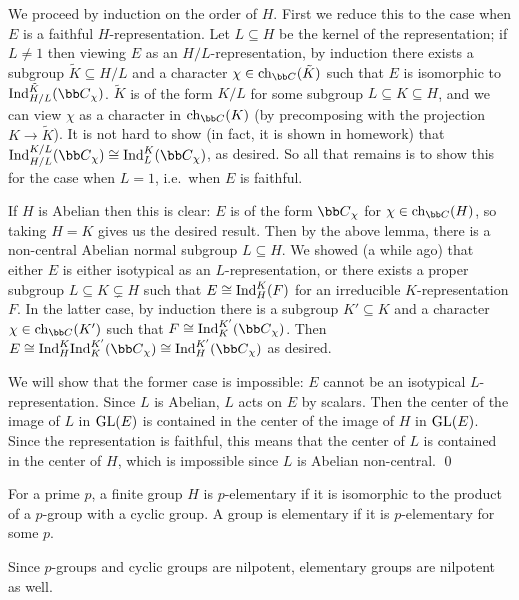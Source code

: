 \bproof

    We proceed by induction on the order of $H$.
    First we reduce this to the case when $E$ is a faithful $H$-representation.
    Let $L\subseteq H$ be the kernel of the representation; if $L\neq1$ then viewing $E$ as an $H/L$-representation, by induction there exists a subgroup $\tilde K\subseteq H/L$ and a
    character $\chi\in\ch_\bC(\tilde K)$ such that $E$ is isomorphic to $\Ind^{\tilde K}_{H/L}(\bC_\chi)$.
    $\tilde K$ is of the form $K/L$ for some subgroup $L\subseteq K\subseteq H$, and we can view $\chi$ as a character in $\ch_\bC(K)$ (by precomposing with the projection $K\to\tilde K$).
    It is not hard to show (in fact, it is shown in homework) that $\Ind^{K/L}_{H/L}(\bC_\chi)\cong\Ind^K_L(\bC_\chi)$, as desired.
    So all that remains is to show this for the case when $L=1$, i.e.\ when $E$ is faithful.

    If $H$ is Abelian then this is clear: $E$ is of the form $\bC_\chi$ for $\chi\in\ch_\bC(H)$, so taking $H=K$ gives us the desired result.
    Then by the above lemma, there is a non-central Abelian normal subgroup $L\subseteq H$.
    We showed (a while ago) that either $E$ is either isotypical as an $L$-representation, or there exists a proper subgroup $L\subseteq K\subsetneq H$ such that $E\cong{\rm Ind}^K_H(F)$ for an
    irreducible $K$-representation $F$.
    In the latter case, by induction there is a subgroup $K'\subseteq K$ and a character $\chi\in\ch_\bC(K')$ such that $F\cong\Ind^{K'}_K(\bC_\chi)$.
    Then $E\cong\Ind^K_H\Ind^{K'}_K(\bC_\chi)\cong\Ind^{K'}_H(\bC_\chi)$ as desired.

    We will show that the former case is impossible: $E$ cannot be an isotypical $L$-representation.
    Since $L$ is Abelian, $L$ acts on $E$ by scalars.
    Then the center of the image of $L$ in ${\rm GL}(E)$ is contained in the center of the image of $H$ in ${\rm GL}(E)$.
    Since the representation is faithful, this means that the center of $L$ is contained in the center of $H$, which is impossible since $L$ is Abelian non-central.
    \qed

\eproof

\bdefn

    For a prime $p$, a finite group $H$ is {\emphcolor $p$-elementary} if it is isomorphic to the product of a $p$-group with a cyclic group.
    A group is {\emphcolor elementary} if it is $p$-elementary for some $p$.

\edefn

Since $p$-groups and cyclic groups are nilpotent, elementary groups are nilpotent as well.

